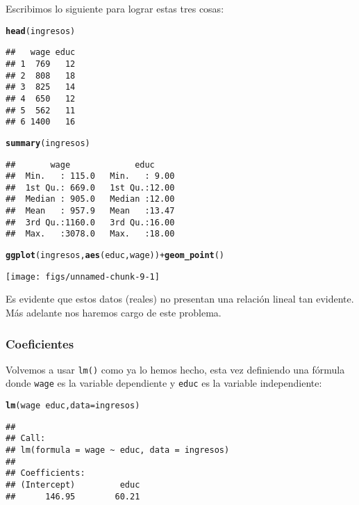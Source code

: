 \documentclass{report}\usepackage[]{graphicx}\usepackage[]{color}
\makeatletter
\newcommand{\hlopt}[1]{\textcolor[rgb]{0,0,0}{#1}}%
\newcommand{\hlstd}[1]{\textcolor[rgb]{0.345,0.345,0.345}{#1}}%
\newcommand{\hlkwc}[1]{\textcolor[rgb]{0.333,0.667,0.333}{#1}}%
\newcommand{\hlkwd}[1]{\textcolor[rgb]{0.737,0.353,0.396}{\textbf{#1}}}%
\newenvironment{kframe}{%
 \def\at@end@of@kframe{}%
 \ifinner\ifhmode%
  \def\at@end@of@kframe{\end{minipage}}%
  \begin{minipage}{\columnwidth}%
 \fi\fi%
 \def\FrameCommand##1{\hskip\@totalleftmargin \hskip-\fboxsep
 \colorbox{shadecolor}{##1}\hskip-\fboxsep
     \hskip-\linewidth \hskip-\@totalleftmargin \hskip\columnwidth}%
 \MakeFramed {\advance\hsize-\width
   \@totalleftmargin\z@ \linewidth\hsize
   \@setminipage}}%
 {\par\unskip\endMakeFramed%
 \at@end@of@kframe}
\newenvironment{knitrout}{}{} %
\makeatother
\begin{document}
Escribimos lo siguiente para lograr estas tres cosas:

\begin{knitrout}
\color{fgcolor}\begin{kframe}
\begin{alltt}
\hlkwd{head}\hlstd{(ingresos)}
\end{alltt}
\begin{verbatim}
##   wage educ
## 1  769   12
## 2  808   18
## 3  825   14
## 4  650   12
## 5  562   11
## 6 1400   16
\end{verbatim}
\begin{alltt}
\hlkwd{summary}\hlstd{(ingresos)}
\end{alltt}
\begin{verbatim}
##       wage             educ      
##  Min.   : 115.0   Min.   : 9.00  
##  1st Qu.: 669.0   1st Qu.:12.00  
##  Median : 905.0   Median :12.00  
##  Mean   : 957.9   Mean   :13.47  
##  3rd Qu.:1160.0   3rd Qu.:16.00  
##  Max.   :3078.0   Max.   :18.00
\end{verbatim}
\begin{alltt}
\hlkwd{ggplot}\hlstd{(ingresos,} \hlkwd{aes}\hlstd{(educ, wage))} \hlopt{+} \hlkwd{geom_point}\hlstd{()}
\end{alltt}
\end{kframe}

{\centering \texttt{[image: figs/unnamed-chunk-9-1]} 

}



\end{knitrout}

Es evidente que estos datos (reales) no presentan una relación lineal tan evidente. Más adelante nos haremos cargo de este problema.

\subsubsection{Coeficientes}

Volvemos a usar \verb|lm()| como ya lo hemos hecho, esta vez definiendo una fórmula donde \verb|wage| es la variable dependiente y \verb|educ| es la variable independiente:
\begin{knitrout}
\color{fgcolor}\begin{kframe}
\begin{alltt}
\hlkwd{lm}\hlstd{(wage} \hlopt{~} \hlstd{educ,} \hlkwc{data} \hlstd{= ingresos)}
\end{alltt}
\begin{verbatim}
## 
## Call:
## lm(formula = wage ~ educ, data = ingresos)
## 
## Coefficients:
## (Intercept)         educ  
##      146.95        60.21
\end{verbatim}
\end{kframe}
\end{knitrout}
\end{document}
